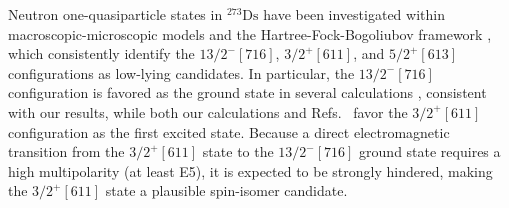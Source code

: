 \documentclass[final,5p,times,twocolumn,number,sort&compress]{elsarticle}
\begin{document}


Neutron one-quasiparticle states in $^{273}\mathrm{Ds}$ have been investigated within macroscopic-microscopic models \cite{jachimowicz2014QalphaValuesSuperheavy,jachimowicz2025CandidatesThreequasiparticleIsomers,cwiok1994ShellStructureHeaviest} and the Hartree-Fock-Bogoliubov framework \cite{Berger2003Gogny,nazarewiczTheoreticalDescriptionSuperheavy}, which consistently identify the $13/2^-[716]$, $3/2^+[611]$, and $5/2^+[613]$ configurations as low-lying candidates. In particular, the $13/2^-[716]$ configuration is favored as the ground state in several calculations \cite{moller2019NuclearPropertiesAstrophysical,jachimowicz2025CandidatesThreequasiparticleIsomers,Berger2003Gogny,cwiok1994ShellStructureHeaviest}, consistent with our results, while both our calculations and Refs.~\cite{Berger2003Gogny,cwiok1994ShellStructureHeaviest} favor the $3/2^+[611]$ configuration as the first excited state. Because a direct electromagnetic transition from the $3/2^+[611]$ state to the $13/2^-[716]$ ground state requires a high multipolarity (at least E5), it is expected to be strongly hindered, making the $3/2^+[611]$ state a plausible spin-isomer candidate.
\end{document}
